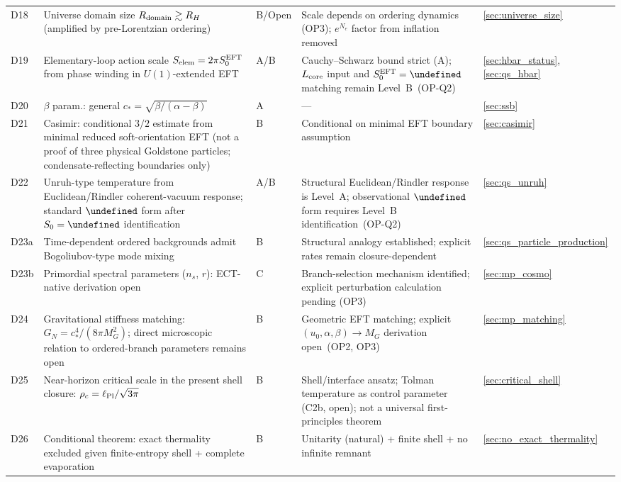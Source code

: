 \documentclass[11pt,a4paper]{article}
\let\hbar\undefined
\numberwithin{equation}{section}
\begin{document}
\begin{longtable}{@{}p{}p{}p{}p{}p{}@{}}
D18 & Universe domain size $R_{\rm domain}\gtrsim R_H$ (amplified by pre-Lorentzian ordering) & B/Open & Scale depends on ordering dynamics (OP3); $e^{N_e}$ factor from inflation removed & \ref{sec:universe_size} \\
D19 & Elementary-loop action scale $S_{\rm elem}=2\pi S_0^{\rm EFT}$ from phase winding in $U(1)$-extended EFT & A/B & Cauchy--Schwarz bound strict (A); $L_{\rm core}$ input and $S_0^{\rm EFT}=\hbar$ matching remain Level~B~(OP-Q2) & \ref{sec:hbar_status}, \ref{sec:qs_hbar} \\
D20 & $\beta$ param.: general $c_*=\sqrt{\beta/(\alpha-\beta)}$ & A & --- & \ref{sec:ssb} \\
D21 & Casimir: conditional $3/2$ estimate from minimal reduced soft-orientation EFT (not a proof of three physical Goldstone particles; condensate-reflecting boundaries only) & B & Conditional on minimal EFT boundary assumption & \ref{sec:casimir} \\
D22 & Unruh-type temperature from Euclidean/Rindler coherent-vacuum response; standard $\hbar$ form after $S_0=\hbar$ identification & A/B & Structural Euclidean/Rindler response is Level~A; observational $\hbar$ form requires Level~B identification~(OP-Q2) & \ref{sec:qs_unruh} \\
D23a & Time-dependent ordered backgrounds admit Bogoliubov-type mode mixing & B & Structural analogy established; explicit rates remain closure-dependent & \ref{sec:qs_particle_production} \\
D23b & Primordial spectral parameters ($n_s$, $r$): ECT-native derivation open & C & Branch-selection mechanism identified; explicit perturbation calculation pending (OP3) & \ref{sec:mp_cosmo} \\
D24 & Gravitational stiffness matching: $G_N=c_*^4/(8\pi M_G^2)$; direct microscopic relation to ordered-branch parameters remains open & B & Geometric EFT matching; explicit $(u_0,\alpha,\beta)\to M_G$ derivation open~(OP2, OP3) & \ref{sec:mp_matching} \\
D25 & Near-horizon critical scale in the present shell closure: $\rho_c=\ell_{\rm Pl}/\sqrt{3\pi}$ & B & Shell/interface ansatz; Tolman temperature as control parameter (C2b, open); not a universal first-principles theorem & \ref{sec:critical_shell} \\
D26 & Conditional theorem: exact thermality excluded given finite-entropy shell + complete evaporation & B & Unitarity (natural) + finite shell + no infinite remnant & \ref{sec:no_exact_thermality} \\

\end{longtable}
\end{document}
